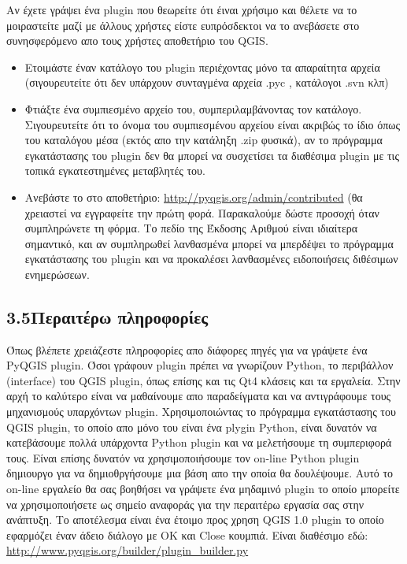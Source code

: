 Αν έχετε γράψει ένα plugin που θεωρείτε ότι έιναι χρήσιμο και θέλετε να το μοιραστείτε μαζί με άλλους χρήστες είστε ευπρόσδεκτοι να το ανεβάσετε στο συνησφερόμενο απο τους χρήστες αποθετήριο του QGIS.
\begin{itemize}
\item Ετοιμάστε έναν κατάλογο του plugin περιέχοντας μόνο τα απαραίτητα αρχεία (σιγουρευτείτε ότι δεν υπάρχουν συνταγμένα αρχεία .pyc , κατάλογοι .svn κλπ)
\item Φτιάξτε ένα συμπιεσμένο αρχείο του, συμπεριλαμβάνοντας τον κατάλογο. Σιγουρευτείτε ότι το όνομα του συμπιεσμένου αρχείου είναι ακριβώς το ίδιο όπως του καταλόγου μέσα (εκτός απο την κατάληξη .zip φυσικά), αν το πρόγραμμα εγκατάστασης του plugin δεν θα μπορεί να συσχετίσει τα διαθέσιμα plugin με τις τοπικά εγκατεστημένες μεταβλητές του.
\item Ανεβάστε το στο αποθετήριο: \url{http://pyqgis.org/admin/contributed} (θα χρειαστεί να εγγραφείτε την πρώτη φορά. Παρακαλούμε δώστε προσοχή όταν συμπληρώνετε τη φόρμα. Το πεδίο της Έκδοσης Αριθμού είναι ιδιαίτερα σημαντικό, και αν συμπληρωθεί λανθασμένα μπορεί να μπερδέψει το πρόγραμμα εγκατάστασης του plugin και να προκαλέσει λανθασμένες ειδοποιήσεις διθέσιμων ενημερώσεων. 
\end{itemize}

\subsection{3.5Περαιτέρω πληροφορίες}

Όπως βλέπετε χρειάζεστε πληροφορίες απο διάφορες πηγές για να γράψετε ένα PyQGIS plugin. Όσοι γράφουν plugin πρέπει να γνωρίζουν Python, το περιβάλλον (interface) του QGIS plugin, όπως επίσης και τις Qt4 κλάσεις και τα εργαλεία.  Στην αρχή το καλύτερο είναι να μαθαίνουμε απο παραδείγματα και να αντιγράφουμε τους μηχανισμούς υπαρχόντων plugin. Χρησιμοποιώντας το πρόγραμμα εγκατάστασης του QGIS plugin, το οποίο απο μόνο του είναι ένα plygin Python, είναι δυνατόν να κατεβάσουμε πολλά υπάρχοντα Python plugin και να μελετήσουμε τη συμπεριφορά τους. Είναι επίσης δυνατόν να χρησιμοποιήσουμε τον on-line Python plugin δημιουργο για να δημιοθργήσουμε μια βάση απο την οποία θα δουλέψουμε. Αυτό το on-line εργαλείο θα σας βοηθήσει να γράψετε ένα μηδαμινό plugin το οποίο μπορείτε να χρησιμοποιήσετε ως σημείο αναφοράς για την περαιτέρω εργασία σας στην ανάπτυξη. Το αποτέλεσμα είναι ένα έτοιμο προς χρηση QGIS 1.0 plugin
 το οποίο εφαρμόζει έναν άδειο διάλογο με ΟΚ και Close κουμπιά. Είναι διαθέσιμο εδώ: \url{http://www.pyqgis.org/builder/plugin_builder.py}

